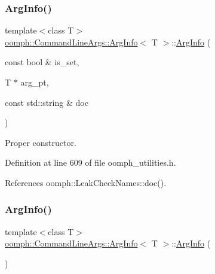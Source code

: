 \subsubsection{\texorpdfstring{Arg\+Info()}{ArgInfo()}\hspace{0.1cm}{\footnotesize\ttfamily [1/2]}}
{\footnotesize\ttfamily template$<$class T$>$ \\
\hyperlink{structoomph_1_1CommandLineArgs_1_1ArgInfo}{oomph\+::\+Command\+Line\+Args\+::\+Arg\+Info}$<$ T $>$\+::\hyperlink{structoomph_1_1CommandLineArgs_1_1ArgInfo}{Arg\+Info} (\begin{DoxyParamCaption}\item[{const bool \&}]{is\+\_\+set,  }\item[{T $\ast$}]{arg\+\_\+pt,  }\item[{const std\+::string \&}]{doc }\end{DoxyParamCaption})\hspace{0.3cm}{\ttfamily [inline]}}



Proper constructor. 



Definition at line 609 of file oomph\+\_\+utilities.\+h.



References oomph\+::\+Leak\+Check\+Names\+::doc().

\mbox{\label{structoomph_1_1CommandLineArgs_1_1ArgInfo_a1dc69aa3f31ccc1b163156df58757dd8}} 
\subsubsection{\texorpdfstring{Arg\+Info()}{ArgInfo()}\hspace{0.1cm}{\footnotesize\ttfamily [2/2]}}
{\footnotesize\ttfamily template$<$class T$>$ \\
\hyperlink{structoomph_1_1CommandLineArgs_1_1ArgInfo}{oomph\+::\+Command\+Line\+Args\+::\+Arg\+Info}$<$ T $>$\+::\hyperlink{structoomph_1_1CommandLineArgs_1_1ArgInfo}{Arg\+Info} (\begin{DoxyParamCaption}{ }\end{DoxyParamCaption})\hspace{0.3cm}{\ttfamily [inline]}}

